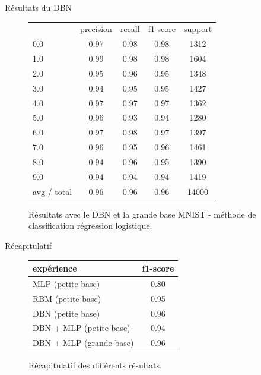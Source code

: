 \begin{frame}{Résultats du DBN}
	\begin{figure}[ht!]
	\centering
	\begin{tabular}{l|c|c|c|c}
           &  precision&    recall&  f1-score&   support\\
        0.0&       0.97 &     0.98 &     0.98 &     1312\\
        1.0 &      0.99  &    0.98  &    0.98  &    1604\\
        2.0  &     0.95   &   0.96   &   0.95   &   1348\\
        3.0   &    0.94    &  0.95    &  0.95    &  1427\\
        4.0    &   0.97     & 0.97     & 0.97     & 1362\\
        5.0      & 0.96      &0.93      &0.94      &1280\\
        6.0     &  0.97&      0.98&      0.97&      1397\\
        7.0       &0.96 &     0.95 &     0.96 &     1461\\
        8.0&       0.94  &    0.96  &    0.95  &    1390\\
        9.0 &      0.94   &   0.94   &   0.94   &   1419\\
avg / total   &    0.96     & 0.96    &  0.96    & 14000
	\end{tabular}
	\caption{Résultats avec le DBN et la grande base MNIST - méthode de classification régression logistique.}
	\end{figure} 
\end{frame}

\begin{frame}{Récapitulatif}
	\begin{figure}[ht!]
	\centering
	\begin{tabular}{|l|c|}
			\hline
			expérience &  f1-score\\
			\hline
			MLP (petite base) & 0.80 \\
			\hline
			RBM (petite base) & 0.95 \\
			\hline
			DBN (petite base) & 0.96 \\
			\hline
			DBN + MLP (petite base) & 0.94 \\
			\hline
			DBN + MLP (grande base) & 0.96 \\
		\hline
	\end{tabular}
	\caption{Récapitulatif des différents résultats.}
	\end{figure} 
\end{frame}